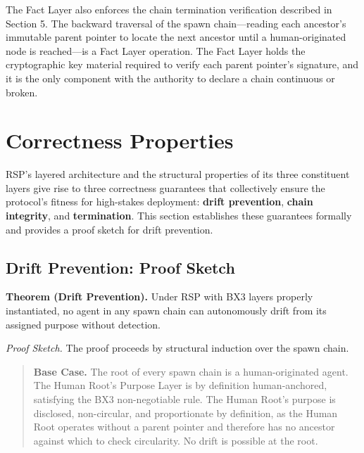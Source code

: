 The Fact Layer also enforces the chain termination verification described in Section 5. The backward traversal of the spawn chain—reading each ancestor's immutable parent pointer to locate the next ancestor until a human-originated node is reached—is a Fact Layer operation. The Fact Layer holds the cryptographic key material required to verify each parent pointer's signature, and it is the only component with the authority to declare a chain continuous or broken.

\section{Correctness Properties}

RSP's layered architecture and the structural properties of its three constituent layers give rise to three correctness guarantees that collectively ensure the protocol's fitness for high-stakes deployment: \textbf{drift prevention}, \textbf{chain integrity}, and \textbf{termination}. This section establishes these guarantees formally and provides a proof sketch for drift prevention.

\subsection{Drift Prevention: Proof Sketch}

\textbf{Theorem (Drift Prevention).} Under RSP with BX3 layers properly instantiated, no agent in any spawn chain can autonomously drift from its assigned purpose without detection.

\textit{Proof Sketch.} The proof proceeds by structural induction over the spawn chain.

\begin{quotation}
\textbf{Base Case.} The root of every spawn chain is a human-originated agent. The Human Root's Purpose Layer is by definition human-anchored, satisfying the BX3 non-negotiable rule. The Human Root's purpose is disclosed, non-circular, and proportionate by definition, as the Human Root operates without a parent pointer and therefore has no ancestor against which to check circularity. No drift is possible at the root.
\end{quotation}

